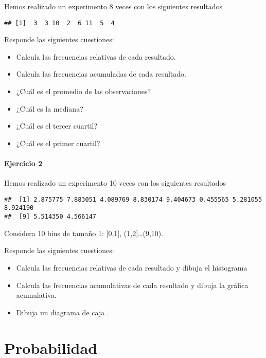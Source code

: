 \documentclass[
]{book}
\providecommand{\tightlist}{%
  \setlength{\itemsep}{0pt}\setlength{\parskip}{0pt}}
\begin{document}
Hemos realizado un experimento 8 veces con los siguientes resultados

\begin{verbatim}
## [1]  3  3 10  2  6 11  5  4
\end{verbatim}

Responde las siguientes cuestiones:

\begin{itemize}
\tightlist
\item
  Calcula las frecuencias relativas de cada resultado.
\item
  Calcula las frecuencias acumuladas de cada resultado.
\item
  ¿Cuál es el promedio de las observaciones?
\item
  ¿Cuál es la mediana?
\item
  ¿Cuál es el tercer cuartil?
\item
  ¿Cuál es el primer cuartil?
\end{itemize}

\hypertarget{ejercicio-2}{%
\subsubsection{Ejercicio 2}\label{ejercicio-2}}

Hemos realizado un experimento 10 veces con los siguientes resultados

\begin{verbatim}
##  [1] 2.875775 7.883051 4.089769 8.830174 9.404673 0.455565 5.281055 8.924190
##  [9] 5.514350 4.566147
\end{verbatim}

Considera 10 bins de tamaño 1: {[}0,1{]}, (1,2{]}\ldots(9,10).

Responde las siguientes cuestiones:

\begin{itemize}
\item
  Calcula las frecuencias relativas de cada resultado y dibuja el histograma
\item
  Calcula las frecuencias acumulativas de cada resultado y dibuja la gráfica acumulativa.
\item
  Dibuja un diagrama de caja .
\end{itemize}

\hypertarget{probabilidad}{%
\chapter{Probabilidad}\label{probabilidad}}
\end{document}
